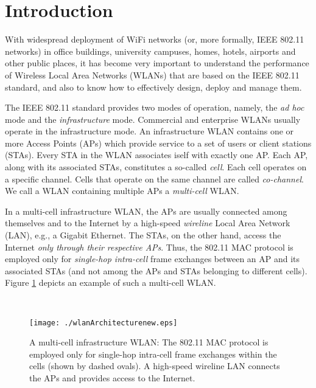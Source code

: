 \documentclass[10pt,a4paper,journal]{IEEEtran}
\theoremstyle{definition}
\theoremstyle{remark}
\theoremstyle{plain}
\begin{document}
\section{Introduction}
\label{sec:introduction}

With widespread deployment of WiFi networks (or, more formally, IEEE 802.11 networks) in office buildings, university campuses, homes, hotels, airports and other public places, it has become very important to understand the performance of Wireless Local Area Networks (WLANs) that are based on the IEEE 802.11 standard, and also to know how to effectively design, deploy and manage them. 

The IEEE 802.11 standard \cite{wanet.IEEE802dot11standard2007} provides two modes of operation, namely, the \textit{ad hoc} mode and the \textit{infrastructure} mode. Commercial and enterprise WLANs usually operate in the infrastructure mode. An infrastructure WLAN contains one or more Access Points (APs) which provide service to a set of users or client stations (STAs). Every STA in the WLAN associates iself with exactly one AP. Each AP, along with its associated STAs, constitutes a so-called \textit{cell}. Each cell operates on a specific channel. Cells that operate on the same channel are called \textit{co-channel}. We call a WLAN containing multiple APs a \textit{multi-cell} WLAN. 

In a multi-cell infrastructure WLAN, the APs are usually connected among themselves and to the Internet by a high-speed \textit{wireline} Local Area Network (LAN), e.g., a Gigabit Ethernet. The STAs, on the other hand, access the Internet \textit{only through their respective APs}. Thus, the 802.11 MAC protocol is employed only for \textit{single-hop intra-cell} frame exchanges between an AP and its associated STAs (and not among the APs and STAs belonging to different cells). Figure \ref{fig:multicell-infrastructure-wlan} depicts an example of such a multi-cell WLAN. 


\begin{figure}[tb]
\centering \
\begin{minipage}{7.8cm}
\begin{center}
\texttt{[image: ./wlanArchitecturenew.eps]}
\caption{A multi-cell infrastructure WLAN: The 802.11 MAC protocol is employed only for single-hop intra-cell frame exchanges within the cells (shown by dashed ovals). A high-speed wireline LAN connects the APs and provides access to the Internet. \label{fig:multicell-infrastructure-wlan}}
\end{center}
\end{minipage}
\end{figure}
\end{document}
